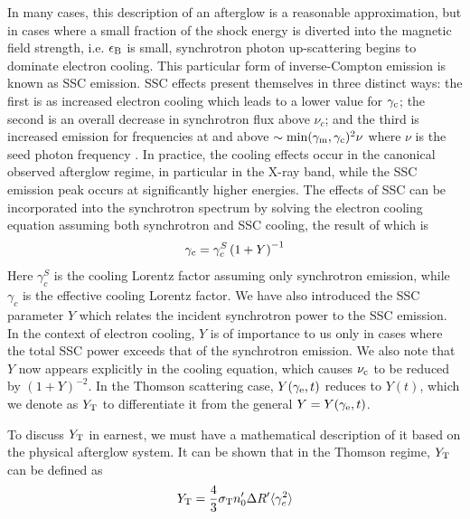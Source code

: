 \documentclass[fleqn,usenatbib]{mnras}
\begin{document}
In many cases, this description of an afterglow is a reasonable approximation, but in cases where a small fraction of the shock energy is diverted into the magnetic field strength, i.e. $\epsilon_{\rm B}$ is small, synchrotron photon up-scattering begins to dominate electron cooling. This particular form of inverse-Compton emission is known as SSC emission. SSC effects present themselves in three distinct ways: the first is as increased electron cooling which leads to a lower value for $\gamma_{\rm c}$; the second is an overall decrease in synchrotron flux above $\nu_c$; and the third is increased emission for frequencies at and above $\sim \rm{min}(\gamma_{m},\gamma_{c})^2 \nu$ where $\nu$ is the seed photon frequency \citep{se01}. In practice, the cooling effects occur in the canonical observed afterglow regime, in particular in the X-ray band, while the SSC emission peak occurs at significantly higher energies. The effects of SSC can be incorporated into the synchrotron spectrum by solving the electron cooling equation assuming both synchrotron and SSC cooling, the result of which is 
\begin{equation}
\gamma_{\rm c} = \gamma_{c}^S\left(1+Y\right)^{-1}
\end{equation}
Here $\gamma_{c}^{S}$ is the cooling Lorentz factor assuming only synchrotron emission, while $\gamma_{c}$ is the effective cooling Lorentz factor. We have also introduced the SSC parameter $Y$ which relates the incident synchrotron power to the SSC emission. In the context of electron cooling, $Y$ is of importance to us only in cases where the total SSC power exceeds that of the synchrotron emission. We also note that $Y$ now appears explicitly in the cooling equation, which causes $\nu_{\rm c}$ to be reduced by  $(1+Y)^{-2}$. In the Thomson scattering case, $Y(\gamma_{\rm e}, t)$ reduces to $Y(t)$, which we denote as $Y_{\rm T}$ to differentiate it from the general $Y=Y(\gamma_{\rm e}, t)$.

To discuss $Y_{\rm T}$ in earnest, we must have a mathematical description of it based on the physical afterglow system.  It can be shown that in the Thomson regime, $Y_{\rm T}$ can be defined as \citep{RL}
\begin{equation}\label{Y}
Y_{\rm T} = \frac{4}{3}\sigma_{\rm T} n_0^{\prime} \Delta R^{\prime} \langle \gamma_{e}^2\rangle
\end{equation}
\end{document}
